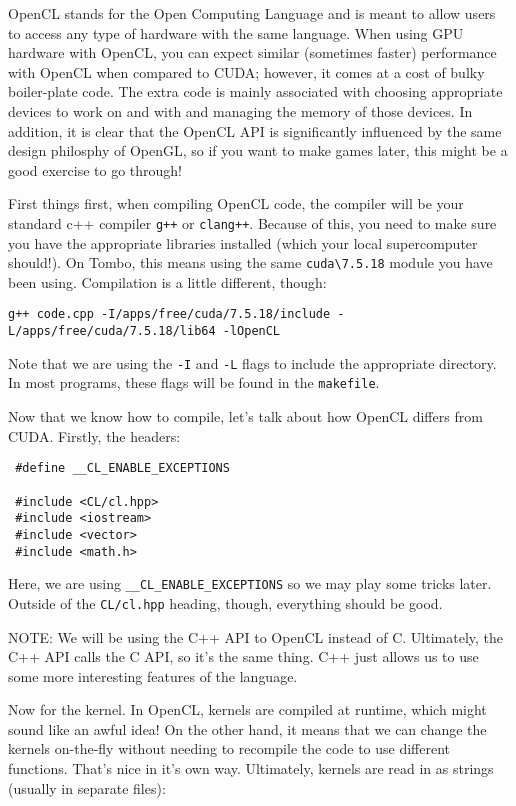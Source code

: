 \documentclass[11pt]{article}
\begin{document}
OpenCL stands for the Open Computing Language and is meant to allow users to access any type of hardware with the same language. 
When using GPU hardware with OpenCL, you can expect similar (sometimes faster) performance with OpenCL when compared to CUDA; however, it comes at a cost of bulky boiler-plate code.
The extra code is mainly associated with choosing appropriate devices to work on and with and managing the memory of those devices.
In addition, it is clear that the OpenCL API is significantly influenced by the same design philosphy of OpenGL, so if you want to make games later, this might be a good exercise to go through!

First things first, when compiling OpenCL code, the compiler will be your standard c++ compiler \lstinline{g++} or \lstinline{clang++}. Because of this, you need to make sure you have the appropriate libraries installed (which your local supercomputer should!). On Tombo, this means using the same \lstinline{cuda\7.5.18} module you have been using. Compilation is a little different, though:

\begin{lstlisting}
g++ code.cpp -I/apps/free/cuda/7.5.18/include -L/apps/free/cuda/7.5.18/lib64 -lOpenCL
\end{lstlisting}

Note that we are using the \lstinline{-I} and \lstinline{-L} flags to include the appropriate directory. In most programs, these flags will be found in the \lstinline{makefile}.

Now that we know how to compile, let's talk about how OpenCL differs from CUDA. Firstly, the headers:

\begin{lstlisting}
 #define __CL_ENABLE_EXCEPTIONS

 #include <CL/cl.hpp>
 #include <iostream>
 #include <vector>
 #include <math.h>

\end{lstlisting}

Here, we are using \lstinline{__CL_ENABLE_EXCEPTIONS} so we may play some tricks later. Outside of the \lstinline{CL/cl.hpp} heading, though, everything should be good.

NOTE: We will be using the C++ API to OpenCL instead of C. Ultimately, the C++ API calls the C API, so it's the same thing. C++ just allows us to use some more interesting features of the language.

Now for the kernel. In OpenCL, kernels are compiled at runtime, which might sound like an awful idea! On the other hand, it means that we can change the kernels on-the-fly without needing to recompile the code to use different functions. That's nice in it's own way. Ultimately, kernels are read in as strings (usually in separate files):
\end{document}
